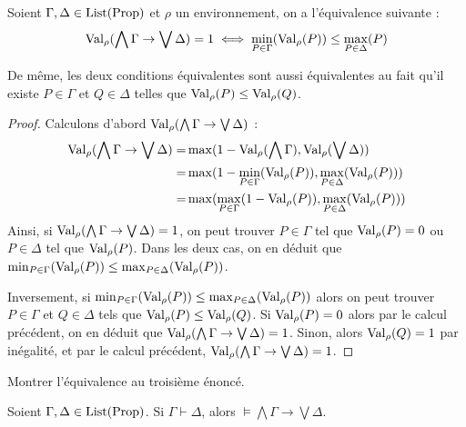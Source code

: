\begin{lemma}
  Soient $\Gamma,\Delta\in\operatorname{List}(\operatorname{Prop})$ et $\rho$ un environnement, on a
  l'équivalence suivante :
  \[ \operatorname{Val}_\rho(\bigwedge\Gamma\to\bigvee\Delta) = 1 \iff
  \min_{P\in\Gamma}(\operatorname{Val}_\rho(P)) \leq \max_{P\in\Delta}(P)\]

  De même, les deux conditions équivalentes sont aussi équivalentes au fait qu'il
  existe $P\in\Gamma$ et $Q\in\Delta$ telles que $\operatorname{Val}_\rho(P)\leq\operatorname{Val}_\rho(Q)$.
\end{lemma}

\begin{proof}
  Calculons d'abord $\operatorname{Val}_\rho(\bigwedge\Gamma\to\bigvee\Delta)$ :
  \begin{align*}
    \operatorname{Val}_\rho(\bigwedge\Gamma\to\bigvee\Delta) =&
    \max(1 - \operatorname{Val}_\rho(\bigwedge\Gamma), \operatorname{Val}_\rho(\bigvee\Delta))\\
    =& \max(1 - \min_{P\in \Gamma}(\operatorname{Val}_\rho(P)),\max_{P\in\Delta}(\operatorname{Val}_\rho(P)))\\
    =& \max(\max_{P\in\Gamma}(1 - \operatorname{Val}_\rho(P)),\max_{P\in\Delta}(\operatorname{Val}_\rho(P)))
  \end{align*}
  Ainsi, si $\operatorname{Val}_\rho(\bigwedge\Gamma\to\bigvee\Delta) = 1$, on peut trouver
  $P\in\Gamma$ tel que $\operatorname{Val}_\rho(P) = 0$ ou $P\in\Delta$ tel que $\operatorname{Val}_\rho(P)$.
  Dans les deux cas, on en déduit que
  $\min_{P\in\Gamma}(\operatorname{Val}_\rho(P)) \leq \max_{P\in\Delta}(\operatorname{Val}_\rho(P))$.

  Inversement, si $\min_{P\in\Gamma}(\operatorname{Val}_\rho(P))\leq\max_{P\in\Delta}(\operatorname{Val}_\rho(P))$
  alors on peut trouver $P\in\Gamma$ et $Q\in\Delta$ tels que
  $\operatorname{Val}_\rho(P)\leq\operatorname{Val}_\rho(Q)$. Si $\operatorname{Val}_\rho(P) = 0$ alors par le calcul
  précédent, on en déduit que $\operatorname{Val}_\rho(\bigwedge\Gamma\to\bigvee\Delta) = 1$.
  Sinon, alors $\operatorname{Val}_\rho(Q) = 1$ par inégalité, et par le calcul précédent,
  $\operatorname{Val}_\rho(\bigwedge\Gamma\to\bigvee\Delta) = 1$.
\end{proof}

\begin{exercise}
  Montrer l'équivalence au troisième énoncé.
\end{exercise}

\begin{theorem}
  Soient $\Gamma,\Delta\in\operatorname{List}(\operatorname{Prop})$. Si $\Gamma\vdash\Delta$, alors
  $\models \bigwedge \Gamma\to \bigvee \Delta$.
\end{theorem}

